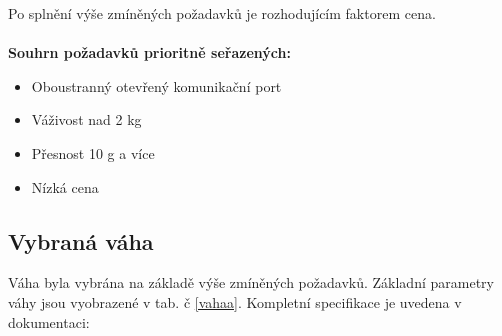 Po splnění výše zmíněných požadavků je rozhodujícím faktorem cena.
\\ \\
\textbf{Souhrn požadavků prioritně seřazených:} %
\begin{itemize}
    \item Oboustranný otevřený komunikační port
    \item Váživost nad 2 kg
    \item Přesnost 10 g a více
    \item Nízká cena
\end{itemize}

\subsection{Vybraná váha}

Váha byla vybrána na základě výše zmíněných požadavků.
Základní parametry váhy jsou vyobrazené v tab. č \ref{vahaa}.
Kompletní specifikace je uvedena v dokumentaci: \cite{vaha_datasheed}



